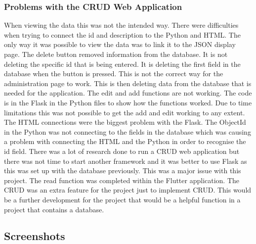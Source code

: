 \subsubsection{Problems with the CRUD Web Application}
When viewing the data this was not the intended way. There were difficulties when trying to connect the id and description to the Python and HTML. The only way it was possible to view the data was to link it to the JSON display page. The delete button removed information from the database. It is not deleting the specific id that is being entered. It is deleting the first field in the database when the button is pressed. This is not the correct way for the administration page to work. This is then deleting data from the database that is needed for the application. The edit and add functions are not working. The code is in the Flask in the Python files to show how the functions worked. Due to time limitations this was not possible to get the add and edit working to any extent. The HTML connections were the biggest problem with the Flask. The ObjectId in the Python was not connecting to the fields in the database which was causing a problem with connecting the HTML and the Python in order to recognise the id field. There was a lot of research done to run a CRUD web application but there was not time to start another framework and it was better to use Flask as this was set up with the database previously. This was a major issue with this project. The read function was completed within the Flutter application. The CRUD was an extra feature for the project just to implement CRUD. This would be a further development for the project that would be a helpful function in a project that contains a database.

\subsection{Screenshots}

